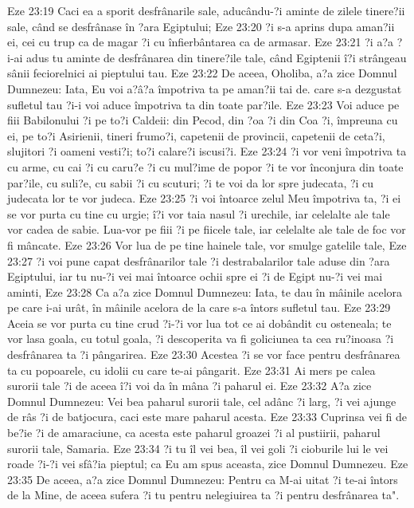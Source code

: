 Eze 23:19  Caci ea a sporit desfrânarile sale, aducându-?i aminte de zilele tinere?ii sale, când se desfrânase în ?ara Egiptului;
Eze 23:20  ?i s-a aprins dupa aman?ii ei, cei cu trup ca de magar ?i cu înfierbântarea ca de armasar.
Eze 23:21  ?i a?a ?i-ai adus tu aminte de desfrânarea din tinere?ile tale, când Egiptenii î?i strângeau sânii feciorelnici ai pieptului tau.
Eze 23:22  De aceea, Oholiba, a?a zice Domnul Dumnezeu: Iata, Eu voi a?â?a împotriva ta pe aman?ii tai de. care s-a dezgustat sufletul tau ?i-i voi aduce împotriva ta din toate par?ile.
Eze 23:23  Voi aduce pe fiii Babilonului ?i pe to?i Caldeii: din Pecod, din ?oa ?i din Coa ?i, împreuna cu ei, pe to?i Asirienii, tineri frumo?i, capetenii de provincii, capetenii de ceta?i, slujitori ?i oameni vesti?i; to?i calare?i iscusi?i.
Eze 23:24  ?i vor veni împotriva ta cu arme, cu cai ?i cu caru?e ?i cu mul?ime de popor ?i te vor înconjura din toate par?ile, cu suli?e, cu sabii ?i cu scuturi; ?i te voi da lor spre judecata, ?i cu judecata lor te vor judeca.
Eze 23:25  ?i voi întoarce zelul Meu împotriva ta, ?i ei se vor purta cu tine cu urgie; î?i vor taia nasul ?i urechile, iar celelalte ale tale vor cadea de sabie. Lua-vor pe fiii ?i pe fiicele tale, iar celelalte ale tale de foc vor fi mâncate.
Eze 23:26  Vor lua de pe tine hainele tale, vor smulge gatelile tale,
Eze 23:27  ?i voi pune capat desfrânarilor tale ?i destrabalarilor tale aduse din ?ara Egiptului, iar tu nu-?i vei mai întoarce ochii spre ei ?i de Egipt nu-?i vei mai aminti,
Eze 23:28  Ca a?a zice Domnul Dumnezeu: Iata, te dau în mâinile acelora pe care i-ai urât, în mâinile acelora de la care s-a întors sufletul tau.
Eze 23:29  Aceia se vor purta cu tine crud ?i-?i vor lua tot ce ai dobândit cu osteneala; te vor lasa goala, cu totul goala, ?i descoperita va fi goliciunea ta cea ru?inoasa ?i desfrânarea ta ?i pângarirea.
Eze 23:30  Acestea ?i se vor face pentru desfrânarea ta cu popoarele, cu idolii cu care te-ai pângarit.
Eze 23:31  Ai mers pe calea surorii tale ?i de aceea î?i voi da în mâna ?i paharul ei.
Eze 23:32  A?a zice Domnul Dumnezeu: Vei bea paharul surorii tale, cel adânc ?i larg, ?i vei ajunge de râs ?i de batjocura, caci este mare paharul acesta.
Eze 23:33  Cuprinsa vei fi de be?ie ?i de amaraciune, ca acesta este paharul groazei ?i al pustiirii, paharul surorii tale, Samaria.
Eze 23:34  ?i tu îl vei bea, îl vei goli ?i cioburile lui le vei roade ?i-?i vei sfâ?ia pieptul; ca Eu am spus aceasta, zice Domnul Dumnezeu.
Eze 23:35  De aceea, a?a zice Domnul Dumnezeu: Pentru ca M-ai uitat ?i te-ai întors de la Mine, de aceea sufera ?i tu pentru nelegiuirea ta ?i pentru desfrânarea ta".
